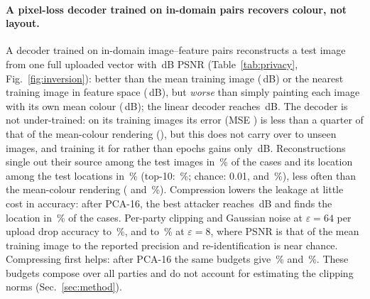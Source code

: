 \paragraph{A pixel-loss decoder trained on in-domain pairs recovers colour, not layout.}
A decoder trained on in-domain image--feature pairs reconstructs a test image from one full uploaded vector with \invFull\,dB PSNR (Table~\ref{tab:privacy}, Fig.~\ref{fig:inversion}): better than the mean training image (\invMean\,dB) or the nearest training image in feature space (\invNN\,dB), but \emph{worse} than simply painting each image with its own mean colour (\invColour\,dB); the linear decoder reaches \invLinFull\,dB. The decoder is not under-trained: on its training images its error (MSE \invFullTrainMse) is less than a quarter of that of the mean-colour rendering (\invColourTrainMse), but this does not carry over to unseen images, and training it for \invEpochs{} rather than \invShortEpochs{} epochs gains only \invGainLong\,dB. Reconstructions single out their source among the \lkN{} test images in \invFullReid\,\% of the cases and its location among the \invNLoc{} test locations in \invFullReidLoc\,\% (top-10: \invFullReidLocTen\,\%; chance: 0.01, \invChanceLoc{} and \invChanceLocTen\,\%), less often than the mean-colour rendering (\invColourReidLoc{} and \invColourReidLocTen\,\%). Compression lowers the leakage at little cost in accuracy: after PCA-16, the best attacker reaches \invBestPCAst\,dB and finds the location in \invBestPCAstReidLoc\,\% of the cases. Per-party clipping and Gaussian noise at $\varepsilon=64$ per upload drop accuracy to \dpFullSsf\,\%, and to \dpFullEight\,\% at $\varepsilon=8$, where PSNR is that of the mean training image to the reported precision and re-identification is near chance. Compressing first helps: after PCA-16 the same budgets give \dpStSsf\,\% and \dpStEight\,\%. These budgets compose over all parties and do not account for estimating the clipping norms (Sec.~\ref{sec:method}).

